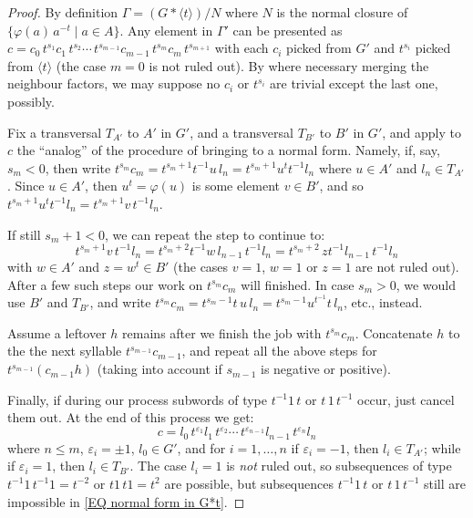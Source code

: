 \documentclass[12pt, a4paper]{amsart}
\newcommand{\1}{\{1\}}
\theoremstyle{plain}
\theoremstyle{definition}
\theoremstyle{remark}
\numberwithin{equation}{section}
\begin{document}
\begin{proof}
By definition $\Gamma=(G * \langle t \rangle)/N$ where 
$N$ is the normal closure of $\{ \varphi(a)\, a^{-t}\! \mathrel{|} a\in A\}$.
%
Any element in $\Gamma'$ can be presented as 
$c= c_0 \, t^{s_{1}}  c_1 \, t^{s_{2}} \cdots \, t^{s_{m-1}} c_{m-1} \, t^{s_{m}} c_m \, t^{s_{m+1}}$
with each  
$c_i$ picked from $G'$
and $t^{s_{i}}$ picked from $\langle t \rangle$ 
(the case $m=0$ is not ruled out). By where necessary merging the neighbour factors, we may suppose 
no $c_i$ or $t^{s_{i}}$ are trivial except the last one, possibly.
%

%
Fix a transversal $T_{A'}$ to $A'$ in $G'$, and a transversal $T_{B'}$ to $B'$ in $G'$, and apply to $c$ the ``analog'' of the procedure of bringing to a normal form. Namely,
%
if, say, $s_{m}<0$, then write $t^{s_{m}} c_m 
= t^{s_{m}+1} t^{-1} u \, l_n
= t^{s_{m}+1}  u^t t^{-1} l_n$ where $u \in A'$ and  $l_n  \in T_{A'}$. 
%
Since $u\in A'$, then $u^t = \varphi(u)$ is some element $v \in B'$, and so 
$t^{s_{m}+1}  u^t t^{-1} l_n
=t^{s_{m}+1}  v \, t^{-1} l_n$.

If still $s_{m}\!+1<0$, we can repeat the step to continue to: 
$$t^{s_{m}+1}  v \, t^{-1} l_n
= t^{s_{m}+2} t^{-1} w\, l_{n-1} \, t^{-1} l_n
= t^{s_{m}+2} \, z t^{-1} l_{n-1} \, t^{-1} l_n
$$
with 
$w\in A'$ and $z=w^t \in B'$ (the cases $v=1$, $w=1$ or $z=1$ are not ruled out). After a few such steps our work on $t^{s_{m}} c_m$ will finished. In case $s_{m}>0$, we would use $B'$ and $T_{B'}$, and write $t^{s_{m}} c_m 
= t^{s_{m}-1} t\, u \, l_n
= t^{s_{m}-1}  u^{t^{-1}} t\, l_n$, etc., instead. 

Assume a leftover $h$ remains after we finish the job with $t^{s_{m}} c_{m}$. 
%
Concatenate $h$ to the the next syllable $t^{s_{m-1}} c_{m-1}$, and repeat all the above steps for 
$t^{s_{m-1}} (c_{m-1} h)$  (taking into account if $s_{m-1}$ is negative or positive). 
%

Finally, if during our process subwords of type $t^{-1} 1 \, t$ or $t\, 1 \, t^{-1}$ occur,  just cancel them out.
%
At the end of this process we 
get:
\begin{equation}
\label{EQ normal form in G*t}
c=l_0 \,t^{\varepsilon_1} l_1 \,t^{\varepsilon_2}
\cdots 
\,t^{\varepsilon_{n-1}}
l_{n-1} 
\,t^{\varepsilon_{n}}
l_n
\end{equation}
where $n \le m$, 
$\varepsilon_i=\pm 1$, 
$l_0\in G'$, and for $i=1,\ldots,n$
if $\varepsilon_i=- 1$, then $l_i\in T_{A'}$; while if $\varepsilon_i=1$, then $l_i\in T_{B'}$. The case $l_i=1$ is \textit{not} ruled out, so subsequences of type $t^{-1} 1\,  t^{-1} 1 = t^{-2}$ or $t 1\,  t 1 = t^2$ are possible, but subsequences $t^{-1} 1 \, t$ or $t\, 1 \, t^{-1}$ still are impossible in \eqref{EQ normal form in G*t}.


\end{proof}
\end{document}
